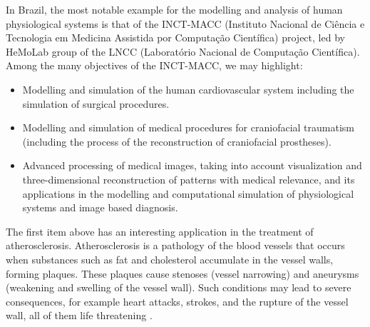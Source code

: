 In Brazil, the most notable example for the modelling and analysis of human physiological systems is that of the INCT-MACC (Instituto Nacional de Ci\^encia e Tecnologia em Medicina Assistida por Computa\c{c}\~ao Cient\'ifica) project, led by HeMoLab group of the LNCC (Laborat\'orio Nacional de Computa\c{c}\~ao Cient\'ifica). Among the many objectives of the INCT-MACC, we may highlight: 

\begin{itemize}
\item Modelling and simulation of the human cardiovascular system including the simulation of surgical procedures.
\item Modelling and simulation of medical procedures for craniofacial traumatism (including the process of the reconstruction of craniofacial prostheses).
\item Advanced processing of medical images, taking into account visualization and three-dimensional reconstruction of patterns with medical relevance, and its applications in the modelling and computational simulation of physiological systems and image based diagnosis.
\end{itemize}

The first item above has an interesting application in the treatment of atherosclerosis. Atherosclerosis is a pathology of the blood vessels that occurs when substances such as fat and cholesterol accumulate in the vessel walls, forming plaques. These plaques cause stenoses (vessel narrowing) and aneurysms (weakening and swelling of the vessel wall). Such conditions may lead to severe consequences, for example heart attacks, strokes, and the rupture of the vessel wall, all of them life threatening \citep{Gennest,Libby}.

